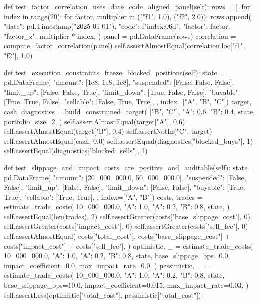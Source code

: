 \documentclass[UTF8,a4paper,fontset=fandol]{ctexart}
\begin{document}
\begin{ProjectCode}
    def test_factor_correlation_uses_date_code_aligned_panel(self):
        rows = []
        for index in range(20):
            for factor, multiplier in (("f1", 1.0), ("f2", 2.0)):
                rows.append({
                    "date": pd.Timestamp("2025-01-01"),
                    "code": f"{index:06d}",
                    "factor": factor,
                    "factor_z": multiplier * index,
                })
        panel = pd.DataFrame(rows)
        correlation = compute_factor_correlation(panel)
        self.assertAlmostEqual(correlation.loc["f1", "f2"], 1.0)

    def test_execution_constraints_freeze_blocked_positions(self):
        state = pd.DataFrame({
            "amount": [1e8, 1e8, 1e8],
            "suspended": [False, False, False],
            "limit_up": [False, False, True],
            "limit_down": [True, False, False],
            "buyable": [True, True, False],
            "sellable": [False, True, True],
        }, index=["A", "B", "C"])
        target, cash, diagnostics = build_constrained_target(
            ["B", "C"],
            {"A": 0.6, "B": 0.4},
            state,
            portfolio_size=2,
        )
        self.assertAlmostEqual(target["A"], 0.6)
        self.assertAlmostEqual(target["B"], 0.4)
        self.assertNotIn("C", target)
        self.assertAlmostEqual(cash, 0.0)
        self.assertEqual(diagnostics["blocked_buys"], 1)
        self.assertEqual(diagnostics["blocked_sells"], 1)

    def test_slippage_and_impact_costs_are_positive_and_auditable(self):
        state = pd.DataFrame({
            "amount": [20_000_000.0, 50_000_000.0],
            "suspended": [False, False],
            "limit_up": [False, False],
            "limit_down": [False, False],
            "buyable": [True, True],
            "sellable": [True, True],
        }, index=["A", "B"])
        costs, trades = estimate_trade_costs(
            10_000_000.0,
            {"A": 1.0},
            {"A": 0.2, "B": 0.8},
            state,
        )
        self.assertEqual(len(trades), 2)
        self.assertGreater(costs["base_slippage_cost"], 0)
        self.assertGreater(costs["impact_cost"], 0)
        self.assertGreater(costs["sell_fee"], 0)
        self.assertAlmostEqual(
            costs["total_cost"],
            costs["base_slippage_cost"] + costs["impact_cost"] + costs["sell_fee"],
        )
        optimistic, _ = estimate_trade_costs(
            10_000_000.0,
            {"A": 1.0},
            {"A": 0.2, "B": 0.8},
            state,
            base_slippage_bps=0.0,
            impact_coefficient=0.0,
            max_impact_rate=0.0,
        )
        pessimistic, _ = estimate_trade_costs(
            10_000_000.0,
            {"A": 1.0},
            {"A": 0.2, "B": 0.8},
            state,
            base_slippage_bps=10.0,
            impact_coefficient=0.015,
            max_impact_rate=0.03,
        )
        self.assertLess(optimistic["total_cost"], pessimistic["total_cost"])


\end{ProjectCode}
\end{document}
